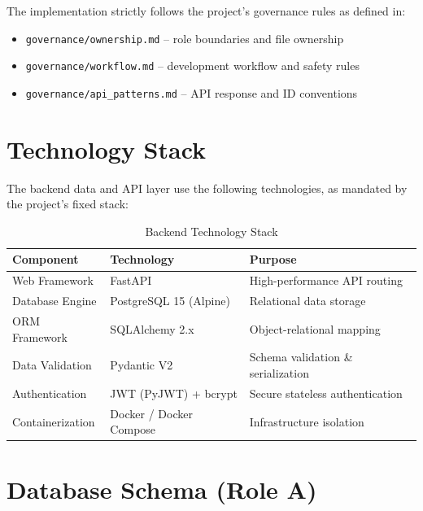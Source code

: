 \documentclass[12pt,a4paper]{article}
\begin{document}
The implementation strictly follows the project's governance rules as defined in:
\begin{itemize}[noitemsep]
    \item \texttt{governance/ownership.md} -- role boundaries and file ownership
    \item \texttt{governance/workflow.md} -- development workflow and safety rules
    \item \texttt{governance/api\_patterns.md} -- API response and ID conventions
\end{itemize}

\section{Technology Stack}

The backend data and API layer use the following technologies, as mandated by the project's fixed stack:

\begin{table}[h!]
\centering
\caption{Backend Technology Stack}
\begin{tabular}{@{}lll@{}}
\toprule
\textbf{Component}   & \textbf{Technology}      & \textbf{Purpose} \\ \midrule
Web Framework         & FastAPI                  & High-performance API routing      \\
Database Engine       & PostgreSQL 15 (Alpine)   & Relational data storage           \\
ORM Framework         & SQLAlchemy 2.x           & Object-relational mapping         \\
Data Validation       & Pydantic V2              & Schema validation \& serialization \\
Authentication        & JWT (PyJWT) + bcrypt     & Secure stateless authentication   \\
Containerization      & Docker / Docker Compose  & Infrastructure isolation          \\
\bottomrule
\end{tabular}
\end{table}

\section{Database Schema (Role A)}
\end{document}

